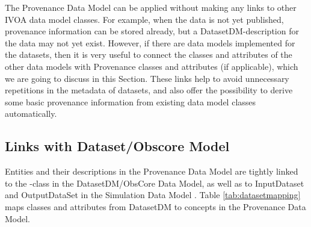 
The Provenance Data Model can be applied without making any links to other 
IVOA data model classes. For example, when the data is not yet published, provenance information
can be stored already, but a DatasetDM-description for the data may not yet exist.
However, if there are data models implemented for the datasets, then it is 
very useful to connect the classes and attributes of the other data models with Provenance classes and attributes (if applicable), which we are going to discuss in this Section. These links help to avoid 
unnecessary repetitions in the metadata of datasets, and also offer the possibility 
to derive some basic provenance information from existing data model classes automatically.


\subsection{Links with Dataset/Obscore Model}
\label{sec:dataset-obscore}

Entities and their descriptions in the Provenance Data Model 
are tightly linked to the -class in the DatasetDM/ObsCore Data Model, as well as to 
InputDataset and OutputDataSet in the Simulation Data Model \citep[SimDM,][]{std:SimDM}.
Table \ref{tab:datasetmapping} maps classes and attributes from DatasetDM
to concepts in the Provenance Data Model.



